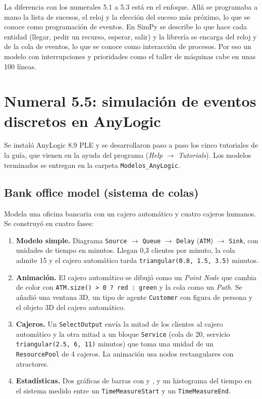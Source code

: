 \documentclass[11pt,letterpaper]{article}
\begin{document}
La diferencia con los numerales 5.1 a 5.3 está en el enfoque. Allá se programaba a mano la lista de sucesos, el
reloj y la elección del suceso más próximo, lo que se conoce como programación de eventos. En SimPy se
describe lo que hace cada entidad (llegar, pedir un recurso, esperar, salir) y la librería se encarga del reloj y
de la cola de eventos, lo que se conoce como interacción de procesos. Por eso un modelo con
interrupciones y prioridades como el taller de máquinas cabe en unas 100 líneas.

\section{Numeral 5.5: simulación de eventos discretos en AnyLogic}

Se instaló AnyLogic 8.9 PLE y se desarrollaron paso a paso los cinco tutoriales de la guía, que vienen en la
ayuda del programa (\emph{Help} $\rightarrow$ \emph{Tutorials}). Los modelos terminados se entregan en la carpeta
\texttt{Modelos\_AnyLogic}.

\subsection{Bank office model (sistema de colas)}

Modela una oficina bancaria con un cajero automático y cuatro cajeros humanos. Se construyó en cuatro fases:

\begin{enumerate}[itemsep=2pt]
\item \textbf{Modelo simple.} Diagrama \texttt{Source} $\rightarrow$ \texttt{Queue} $\rightarrow$
\texttt{Delay} (\texttt{ATM}) $\rightarrow$ \texttt{Sink}, con unidades de tiempo en minutos. Llegan 0,3
clientes por minuto, la cola admite 15 y el cajero automático tarda \texttt{triangular(0.8, 1.5, 3.5)} minutos.
\item \textbf{Animación.} El cajero automático se dibujó como un \emph{Point Node} que cambia de color con
\texttt{ATM.size() > 0 ? red : green} y la cola como un \emph{Path}. Se añadió una ventana 3D, un tipo de agente
\texttt{Customer} con figura de persona y el objeto 3D del cajero automático.
\item \textbf{Cajeros.} Un \texttt{SelectOutput} envía la mitad de los clientes al cajero automático y la otra
mitad a un bloque \texttt{Service} (cola de 20, servicio \texttt{triangular(2.5, 6, 11)} minutos) que toma una
unidad de un \texttt{ResourcePool} de 4 cajeros. La animación usa nodos rectangulares con atractores.
\item \textbf{Estadísticas.} Dos gráficas de barras con  y
, y un histograma del tiempo en el sistema medido entre un
\texttt{TimeMeasureStart} y un \texttt{TimeMeasureEnd}.
\end{enumerate}
\end{document}
